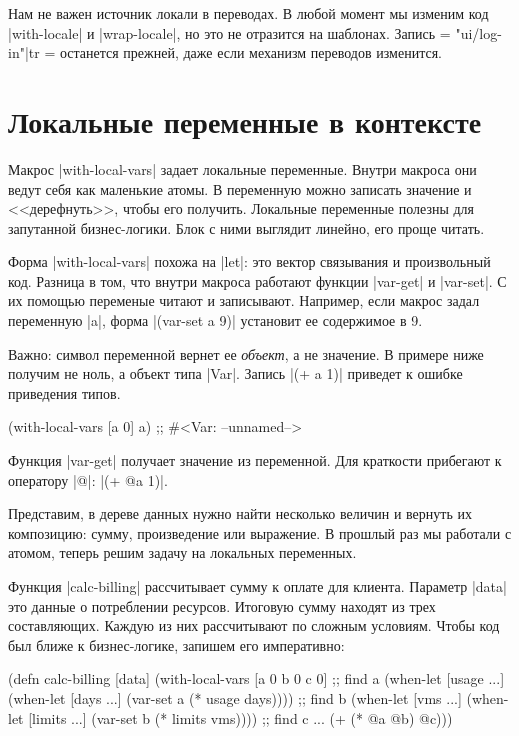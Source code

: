 Нам не важен источник локали в переводах. В любой момент мы изменим код
\spverb|with-locale| и \spverb|wrap-locale|, но это не отразится на
шаблонах. Запись \spverb={{ "ui/log-in"|tr }}= останется прежней, даже если
механизм переводов изменится.

\section{Локальные переменные в контексте}

Макрос \spverb|with-local-vars| задает локальные переменные. Внутри макроса они
ведут себя как маленькие атомы. В переменную можно записать значение и
<<дерефнуть>>, чтобы его получить. Локальные переменные полезны для запутанной
бизнес-логики. Блок с ними выглядит линейно, его проще читать.

Форма \spverb|with-local-vars| похожа на \spverb|let|: это вектор связывания и
произвольный код. Разница в том, что внутри макроса работают функции
\spverb|var-get| и \spverb|var-set|. С их помощью переменые читают и
записывают. Например, если макрос задал переменную \spverb|a|, форма
\spverb|(var-set a 9)| установит ее содержимое в 9.

Важно: символ переменной вернет ее \emph{объект}, а не значение. В примере ниже
получим не ноль, а объект типа \spverb|Var|. Запись \spverb|(+ a 1)| приведет к
ошибке приведения типов.

\begin{english}
  \begin{clojure}
(with-local-vars [a 0] a)
;; #<Var: --unnamed-->
  \end{clojure}
\end{english}

Функция \spverb|var-get| получает значение из переменной. Для краткости
прибегают к оператору \spverb|@|: \spverb|(+ @a 1)|.

Представим, в дереве данных нужно найти несколько величин и вернуть их
композицию: сумму, произведение или выражение. В прошлый раз мы работали с
атомом, теперь решим задачу на локальных переменных.

Функция \spverb|calc-billing| рассчитывает сумму к оплате для клиента. Параметр
\spverb|data| это данные о потреблении ресурсов. Итоговую сумму находят из трех
составляющих. Каждую из них рассчитывают по сложным условиям. Чтобы код был
ближе к бизнес-логике, запишем его императивно:

\begin{english}
  \begin{clojure}
(defn calc-billing [data]
  (with-local-vars
    [a 0 b 0 c 0]
    ;; find a
    (when-let [usage ...]
      (when-let [days ...]
        (var-set a (* usage days))))
    ;; find b
    (when-let [vms ...]
      (when-let [limits ...]
        (var-set b (* limits vms))))
    ;; find c ...
    (+ (* @a @b) @c)))
  \end{clojure}
\end{english}

